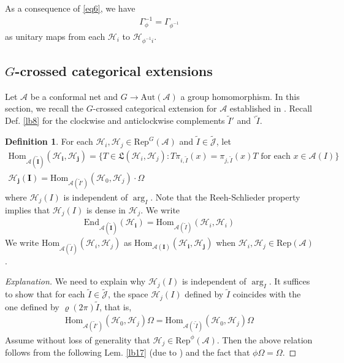 \documentclass[11pt,b5paper,notitlepage]{article}
\theoremstyle{definition}
\newtheorem{df}{Definition}[section]
\theoremstyle{plain}
\newcommand{\fk}{\mathfrak}
\newcommand{\wtd}{\widetilde}
\newcommand{\End}{\mathrm{End}} %
\newcommand{\Hom}{\mathrm{Hom}}
\newcommand{\Rep}{\mathrm{Rep}}
\newcommand{\RepGA}{\mathrm{Rep}^G(\mathcal A)}
\newcommand{\Jtd}{\widetilde{\mathcal J}}
\newcommand{\RepA}{\mathrm{Rep}(\mathcal A)}
\newcommand{\bpr}{{}^\backprime}
\newcommand{\Aut}{\mathrm{Aut}}
\newcommand{\MA}{\mathcal A}
\newcommand{\MH}{\mathcal H}
\numberwithin{equation}{section}
\begin{document}
As a consequence of \eqref{eq6}, we have
\begin{align}\label{eq7}
\Gamma_\phi^{-1}=\Gamma_{\phi^{-1}}
\end{align}
as unitary maps from each $\MH_i$ to $\MH_{\phi^{-1}i}$.





\subsection{$G$-crossed categorical extensions}

Let $\MA$ be a conformal net and $G\rightarrow\Aut(\MA)$ a group homomorphism. In this section, we recall the $G$-crossed categorical extension for $\MA$ established in \cite{MS26a,MS26b}. Recall Def. \ref{lb8} for the clockwise and anticlockwise complements $\wtd I'$ and $\bpr\wtd I$.

\begin{df}
For each $\MH_i,\MH_j\in\RepGA$ and $\wtd I\in\Jtd$, let
\begin{gather*}
\pmb{\Hom_{\MA(\wtd I)}(\MH_i,\MH_j)}=\big\{T\in\fk L(\MH_i,\MH_j):T\pi_{i,\wtd I}(x)=\pi_{j,\wtd I}(x)T\text{ for each }x\in\MA(I)\big\}\\
\pmb{\MH_j(I)}=\Hom_{\MA(\wtd I')}(\MH_0,\MH_j)\cdot\Omega
\end{gather*}
where $\MH_j(I)$ is independent of $\arg_I$. Note that the Reeh-Schlieder property implies that $\MH_j(I)$ is dense in $\MH_j$. We write
\begin{align*}
\pmb{\End_{\MA(\wtd I)}(\MH_i)}=\Hom_{\MA(\wtd I)}(\MH_i,\MH_i)
\end{align*}
We write $\Hom_{\MA(\wtd I)}(\MH_i,\MH_j)$ as $\pmb{\Hom_{\MA(I)}(\MH_i,\MH_j)}$ when $\MH_i,\MH_j\in\RepA$.
\end{df}



\begin{proof}[Explanation]
We need to explain why $\MH_j(I)$ is independent of $\arg_I$. It suffices to show that for each $\wtd I\in\Jtd$, the space $\MH_j(I)$ defined by $\wtd I$ coincides with the one defined by $\varrho(2\pi)\wtd I$, that is,
\begin{align*}
\Hom_{\MA(\wtd I')}(\MH_0,\MH_j)\Omega=\Hom_{\MA(\bpr\wtd I)}(\MH_0,\MH_j)\Omega
\end{align*}
Assume without loss of generality that $\MH_j\in\Rep^\phi(\MA)$. Then the above relation follows from the following Lem. \ref{lb17} (due to \cite[Eq. (6)]{MS26a}) and the fact that $\phi\Omega=\Omega$.
\end{proof}
\end{document}
